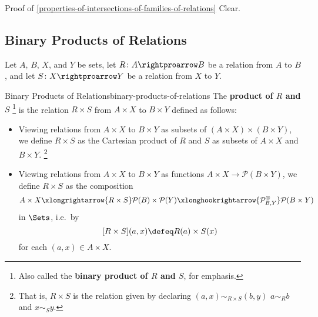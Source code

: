 \begin{Proof}{Proof of \cref{properties-of-intersections-of-families-of-relations}}%
    Clear.
\end{Proof}
\subsection{Binary Products of Relations}\label{subsection-binary-products-of-relations}
Let $A$, $B$, $X$, and $Y$ be sets, let $R\colon A\rightproarrow B$ be a relation from $A$ to $B$, and let $S\colon X\rightproarrow Y$ be a relation from $X$ to $Y$.
\begin{definition}{Binary Products of Relations}{binary-products-of-relations}%
    The \textbf{product of $R$ and $S$}%
    \footnote{%
        Also called the \textbf{binary product of $R$ and $S$}, for emphasis.
        \par\vspace*{\TCBBoxCorrection}
    } %
    is the relation $R\times S$ from $A\times X$ to $B\times Y$ defined as follows:
    \begin{itemize}
        \item Viewing relations from $A\times X$ to $B\times Y$ as subsets of $(A\times X)\times(B\times Y)$, we define $R\times S$ as the Cartesian product of $R$ and $S$ as subsets of $A\times X$ and $B\times Y$.%
            \footnote{%
                That is, $R\times S$ is the relation given by declaring $(a,x)\sim_{R\times S}(b,y)$ \textiff $a\sim_{R}b$ and $x\sim_{S}y$.
                \par\vspace*{\TCBBoxCorrection}
            }%
        \item Viewing relations from $A\times X$ to $B\times Y$ as functions $A\times X\to\mathcal{P}(B\times Y)$, we define $R\times S$ as the composition
            \[
                A\times X
                \xlongrightarrow{R\times S}
                \mathcal{P}(B)\times\mathcal{P}(Y)
                \xlonghookrightarrow{\mathcal{P}^{\otimes}_{B,Y}}
                \mathcal{P}(B\times Y)
            \]%
            in $\Sets$, i.e.\ by
            \[
                [R\times S](a,x)
                \defeq
                R(a)\times S(x)
            \]%
            for each $(a,x)\in A\times X$.
    \end{itemize}
\end{definition}
